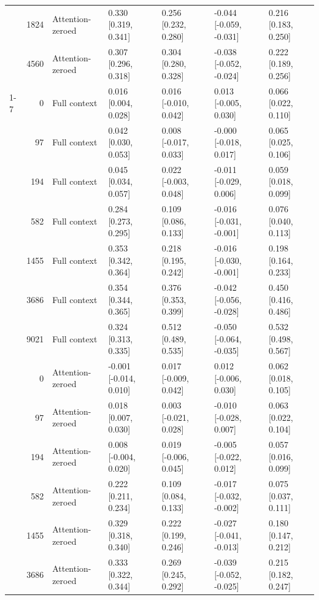 \documentclass[11pt]{article}
\begin{document}
\begin{longtable}[t]{lrlllll}
\nopagebreak
 & 1824 & Attention-zeroed & 0.330 [0.319, 0.341] & 0.256 [0.232, 0.280] & -0.044 [-0.059, -0.031] & 0.216 [0.183, 0.250]\\
\nopagebreak
\multirow{-14}{*}{\raggedright\arraybackslash BabyLM-350M} & 4560 & Attention-zeroed & 0.307 [0.296, 0.318] & 0.304 [0.280, 0.328] & -0.038 [-0.052, -0.024] & 0.222 [0.189, 0.256]\\
\cmidrule{1-7}\pagebreak[0]
 & 0 & Full context & 0.016 [0.004, 0.028] & 0.016 [-0.010, 0.042] & 0.013 [-0.005, 0.030] & 0.066 [0.022, 0.110]\\
\nopagebreak
 & 97 & Full context & 0.042 [0.030, 0.053] & 0.008 [-0.017, 0.033] & -0.000 [-0.018, 0.017] & 0.065 [0.025, 0.106]\\
\nopagebreak
 & 194 & Full context & 0.045 [0.034, 0.057] & 0.022 [-0.003, 0.048] & -0.011 [-0.029, 0.006] & 0.059 [0.018, 0.099]\\
\nopagebreak
 & 582 & Full context & 0.284 [0.273, 0.295] & 0.109 [0.086, 0.133] & -0.016 [-0.031, -0.001] & 0.076 [0.040, 0.113]\\
\nopagebreak
 & 1455 & Full context & 0.353 [0.342, 0.364] & 0.218 [0.195, 0.242] & -0.016 [-0.030, -0.001] & 0.198 [0.164, 0.233]\\
\nopagebreak
 & 3686 & Full context & 0.354 [0.344, 0.365] & 0.376 [0.353, 0.399] & -0.042 [-0.056, -0.028] & 0.450 [0.416, 0.486]\\
\nopagebreak
 & 9021 & Full context & 0.324 [0.313, 0.335] & 0.512 [0.489, 0.535] & -0.050 [-0.064, -0.035] & 0.532 [0.498, 0.567]\\
\nopagebreak
 & 0 & Attention-zeroed & -0.001 [-0.014, 0.010] & 0.017 [-0.009, 0.042] & 0.012 [-0.006, 0.030] & 0.062 [0.018, 0.105]\\
\nopagebreak
 & 97 & Attention-zeroed & 0.018 [0.007, 0.030] & 0.003 [-0.021, 0.028] & -0.010 [-0.028, 0.007] & 0.063 [0.022, 0.104]\\
\nopagebreak
 & 194 & Attention-zeroed & 0.008 [-0.004, 0.020] & 0.019 [-0.006, 0.045] & -0.005 [-0.022, 0.012] & 0.057 [0.016, 0.099]\\
\nopagebreak
 & 582 & Attention-zeroed & 0.222 [0.211, 0.234] & 0.109 [0.084, 0.133] & -0.017 [-0.032, -0.002] & 0.075 [0.037, 0.111]\\
\nopagebreak
 & 1455 & Attention-zeroed & 0.329 [0.318, 0.340] & 0.222 [0.199, 0.246] & -0.027 [-0.041, -0.013] & 0.180 [0.147, 0.212]\\
\nopagebreak
 & 3686 & Attention-zeroed & 0.333 [0.322, 0.344] & 0.269 [0.245, 0.292] & -0.039 [-0.052, -0.025] & 0.215 [0.182, 0.247]\\

\end{longtable}
\end{document}
